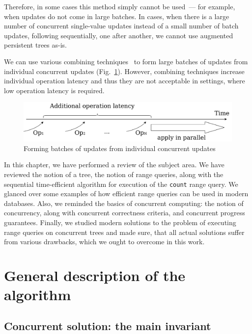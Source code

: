 \documentclass[times, dvipsnames,%
               languages={russian,english} %
              ]{itmo-student-thesis}
\begin{document}
Therefore, in some cases this method simply cannot be used~--- for example, when updates do not come in large batches. In cases, when there is a large number of concurrent single-value updates instead of a small number of batch updates, following sequentially, one after another, we cannot use augmented persistent trees as-is.

We can use various combining techniques~\cite{hendler2010flat,aksenov2017parallel} to form large batches of updates from individual concurrent updates (Fig.~\ref{transaction-batching-pic}). However, combining techniques increase individual operation latency and thus they are not acceptable in settings, where low operation latency is required.

\begin{figure}[H]
  \centering
  \caption{Forming batches of updates from individual concurrent updates}
  \label{transaction-batching-pic}
  \includegraphics[width=\linewidth]{pics/transaction-batching.png}
\end{figure}

\finishrelatedwork

\chapterconclusion

In this chapter, we have performed a review of the subject area. We have reviewed the notion of a tree, the notion of range queries, along with the sequential time-efficient algorithm for execution of the \texttt{count} range query. We glanced over some examples of how efficient range queries can be used in modern databases. Also, we reminded the basics of concurrent computing: the notion of concurrency, along with concurrent correctness criteria, and concurrent progress guarantees. Finally, we studied modern solutions to the problem of executing range queries on concurrent trees and made sure, that all actual solutions suffer from various drawbacks, which we ought to overcome in this work.

\chapter{General description of the algorithm}
\label{algorithm-general-chapter}

\section{Concurrent solution: the main invariant}
\label{main-invariant-chapter}
\end{document}
